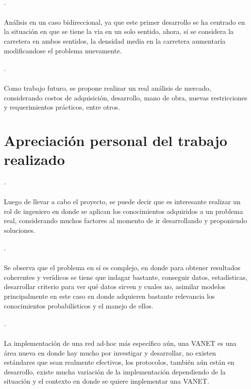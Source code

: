 \documentclass[12pt]{article}
\begin{document}
\paragraph{$\cdot$}Análisis en un caso bidireccional, ya que este primer desarrollo se ha centrado en 
la situación en que se tiene la via en un solo sentido, ahora, si se considera la carretera en ambos
sentidos, la densidad media en la carretera aumentaría modificandose el problema nuevamente.
\paragraph{$\cdot$}Como trabajo futuro, se propone realizar un real análisis de mercado, considerando
costos de adquisición, desarrollo, mano de obra, nuevas restricciones y requerimientos prácticos, entre 
otros.


\newpage
\section{Apreciación personal del trabajo realizado}
\paragraph{$\cdot$}
Luego de llevar a cabo el proyecto, se puede decir que es interesante realizar un rol de ingeniero en donde 
se aplican los conocimientos adquiridos a un problema real, considerando muchos factores al momento de ir 
desarrollando y proponiendo soluciones.
\paragraph{$\cdot$}
Se observa que el problema en sí es complejo, en donde para obtener resultados coherentes y verídicos se 
tiene que indagar bastante, conseguir datos, estadísticas, desarrollar criterio para ver qué datos sirven 
y cuales no, asimilar modelos principalmente en este caso en donde adquieren bastante relevancia los 
conocimientos probabilísticos y el manejo de ellos.
\paragraph{$\cdot$}
La implementación de una red ad-hoc más específico aún, una VANET es una área nueva en donde hay mucho por 
investigar y desarrollar, no existen estándares que sean realmente efectivos, los protocolos, también aún 
están en desarrollo, existe mucha variación de la implementación dependiendo de la situación y el contexto 
en donde se quiere implementar una VANET.
\end{document}
